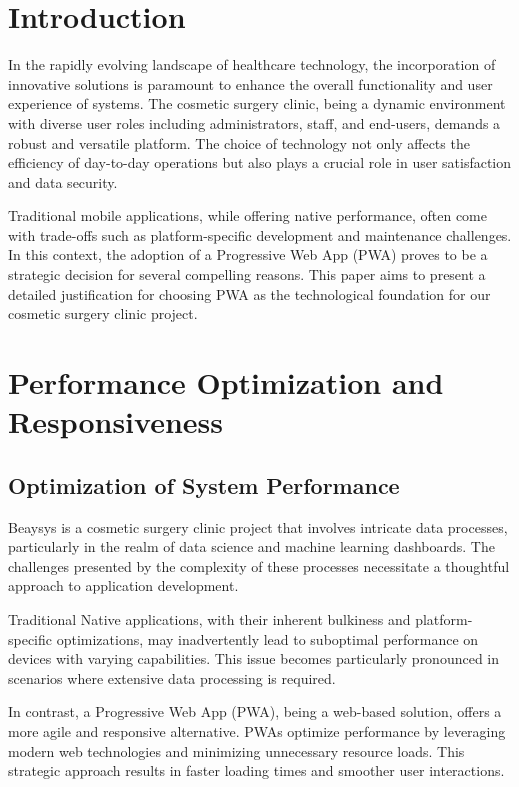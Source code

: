 \documentclass[conference]{IEEEtran}
\begin{document}
\section{Introduction}
In the rapidly evolving landscape of healthcare technology, the incorporation of innovative solutions is paramount to enhance the overall functionality and user experience of systems. The cosmetic surgery clinic, being a dynamic environment with diverse user roles including administrators, staff, and end-users, demands a robust and versatile platform. The choice of technology not only affects the efficiency of day-to-day operations but also plays a crucial role in user satisfaction and data security.

Traditional mobile applications, while offering native performance, often come with trade-offs such as platform-specific development and maintenance challenges. In this context, the adoption of a Progressive Web App (PWA) proves to be a strategic decision for several compelling reasons. This paper aims to present a detailed justification for choosing PWA as the technological foundation for our cosmetic surgery clinic project.

\section{Performance Optimization and Responsiveness}

\subsection{Optimization of System Performance}
Beaysys is a cosmetic surgery clinic project that involves intricate data processes, particularly in the realm of data science and machine learning dashboards. The challenges presented by the complexity of these processes necessitate a thoughtful approach to application development.

Traditional Native applications, with their inherent bulkiness and platform-specific optimizations, may inadvertently lead to suboptimal performance on devices with varying capabilities. This issue becomes particularly pronounced in scenarios where extensive data processing is required.

In contrast, a Progressive Web App (PWA), being a web-based solution, offers a more agile and responsive alternative. PWAs optimize performance by leveraging modern web technologies and minimizing unnecessary resource loads. This strategic approach results in faster loading times and smoother user interactions.
\end{document}
